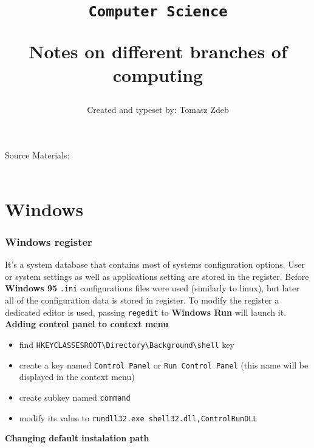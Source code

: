\documentclass[11pt,a4paper]{article}
\date{\vspace{-3em}}
\title{\vspace{-2em}\texttt{Computer Science}\\ \begin{large} Notes on different branches of computing\end{large}\vspace{-0.5em}}
\author{Created and typeset by: Tomasz Zdeb}
\def\bs{\textbackslash}
\def\us{\textunderscore}
\def\source_space{\vspace{0.2em}}
\newcommand{\myline}[2]{\noindent\makebox[\linewidth]{\rule{#1cm}{#2pt}}}
\begin{document}
\maketitle
\myline{16}{1}

\begin{scriptsize}
Source Materials:\\
\source_space\\
\end{scriptsize}

\myline{16}{1}

\section{Windows}
\subsubsection{Windows register}
It's a system database that contains most of systems configuration options. User or system settings as well as applications setting are stored in the register. Before \textbf{Windows 95} \texttt{.ini} configurations files were used (similarly to linux), but later all of the configuration data is stored in register. To modify the register a dedicated editor is used, passing \texttt{regedit} to \textbf{Windows Run} will launch it.\\

\textbf{Adding control panel to context menu}
\begin{itemize}
\item find \texttt{HKEY{\us}CLASSES{\us}ROOT{\bs}Directory{\bs}Background{\bs}shell} key
\item create a key named \texttt{Control Panel} or \texttt{Run Control Panel} (this name will be displayed in the context menu)
\item create subkey named \texttt{command}
\item modify its value to \texttt{rundll32.exe shell32.dll,Control{\us}RunDLL}
\end{itemize}

\textbf{Changing default instalation path}
\end{document}
